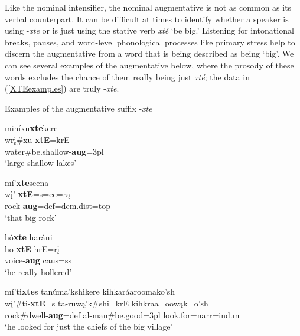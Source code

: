 \label{augmentativesuffixredux}

Like the nominal intensifier, the nominal augmentative is not as common as its verbal counterpart. It can be difficult at times to identify whether a speaker is using -\textit{xte} or is just using the stative verb \textit{xté} `be big.' Listening for intonational breaks, pauses, and word-level phonological processes like primary stress help to discern the augmentative from a word that is being described as being `big'. We can see several examples of the augmentative below, where the prosody of these words excludes the chance of them really being just \textit{xté}; the data in (\ref{XTEexamples}) are truly -\textit{xte}.

\begin{exe}

\item\label{XTEexamples} Examples of the augmentative suffix -\textit{xte}

    \begin{xlist}
    
    \item\label{XTEexamples1} \glll miníxu\textbf{xte}kere\\
    wrį\#xu-\textbf{xtE}=krE\\
    \textnormal{water}\#\textnormal{be.shallow}-\textbf{aug}=3pl\\
    \glt `large shallow lakes' \citep[11]{hollow1973a}
    
    \item\label{XTEexamples2} \glll mí'\textbf{xte}seena\\
    wį'-\textbf{xtE}=s=ee=rą\\
    \textnormal{rock}-\textbf{aug}=def=dem.dist=top\\
    \glt `that big rock' \citep[18]{hollow1973a}
    
    \item\label{XTEexamples3} \glll hó\textbf{xte} haráni\\
    ho-\textbf{xtE} hrE=rį\\
    \textnormal{voice}-\textbf{aug} caus=ss\\
    \glt `he really hollered' \citep[46]{hollow1973a}
    
    \item\label{XTEexamples4} \glll mí'ti\textbf{xte}s tanúma'kshikere kihkaráaroomako'sh\\
    wį'\#ti-\textbf{xtE}=s ta-ruwą'k\#shi=krE kihkraa=oowąk=o'sh\\
    \textnormal{rock}\#\textnormal{dwell}-\textbf{aug}=def al-\textnormal{man}\#\textnormal{be.good}=3pl \textnormal{look.for}=narr=ind.m\\
    \glt `he looked for just the chiefs of the big village' \citep[105]{hollow1973b}
    
    \end{xlist}

\end{exe}

